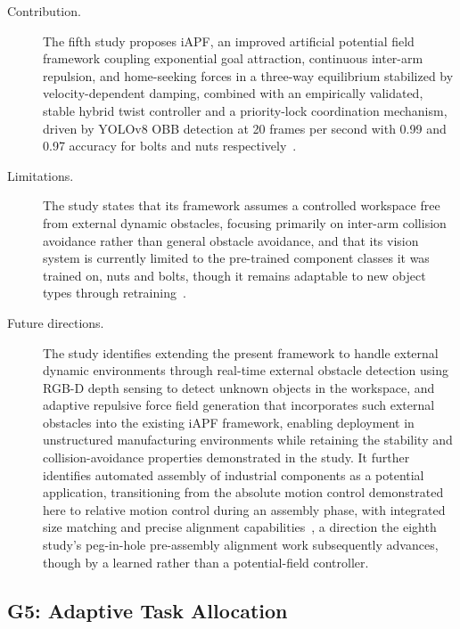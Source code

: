 \begin{description}
    \item[Contribution.] The fifth study proposes iAPF, an improved artificial potential field
    framework coupling exponential goal attraction, continuous inter-arm repulsion, and home-seeking
    forces in a three-way equilibrium stabilized by velocity-dependent damping, combined with an
    empirically validated, stable hybrid twist controller and a priority-lock coordination
    mechanism, driven by YOLOv8 OBB detection at 20 frames per second with 0.99 and 0.97 accuracy
    for bolts and nuts respectively~\citep{surya2025iapf}.

    \item[Limitations.] The study states that its framework assumes a controlled workspace free from
    external dynamic obstacles, focusing primarily on inter-arm collision avoidance rather than
    general obstacle avoidance, and that its vision system is currently limited to the pre-trained
    component classes it was trained on, nuts and bolts, though it remains adaptable to new object
    types through retraining~\citep{surya2025iapf}.

    \item[Future directions.] The study identifies extending the present framework to handle external
    dynamic environments through real-time external obstacle detection using RGB-D depth sensing to
    detect unknown objects in the workspace, and adaptive repulsive force field generation that
    incorporates such external obstacles into the existing iAPF framework, enabling deployment in
    unstructured manufacturing environments while retaining the stability and collision-avoidance
    properties demonstrated in the study. It further identifies automated assembly of industrial
    components as a potential application, transitioning from the absolute motion control
    demonstrated here to relative motion control during an assembly phase, with integrated size
    matching and precise alignment capabilities~\citep{surya2025iapf}, a direction the eighth study's
    peg-in-hole pre-assembly alignment work subsequently advances, though by a learned rather than a
    potential-field controller.
\end{description}

\subsection{G5: Adaptive Task Allocation}\label{sec:concl_g5}

